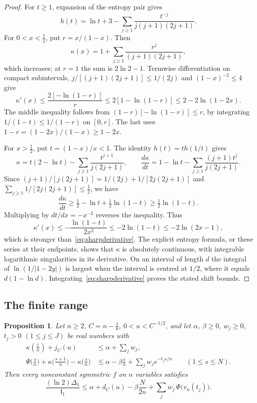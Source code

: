 \documentclass[11pt]{amsart}
\newtheorem{proposition}[theorem]{Proposition}
\theoremstyle{definition}
\theoremstyle{remark}
\newcommand{\I}{\mathsf I}
\begin{document}
\begin{proof}
For $t\ge1$, expansion of the entropy pair gives
\[
 h(t)=\ln t+3-\sum_{j\ge1}\frac{t^{-j}}{j(j+1)(2j+1)}.
\]
For $0<x<\frac12$, put $r=x/(1-x)$. Then
\[
 \kappa(x)=1+\sum_{j\ge1}\frac{r^j}{(j+1)(2j+1)},
\]
which increases; at $r=1$ the sum is $2\ln2-1$. Termwise differentiation on compact subintervals, $j/[(j+1)(2j+1)]\le1/(2j)$ and $(1-x)^{-2}\le4$ give
\[
 \kappa'(x)\le\frac{2[-\ln(1-r)]}{r}
 \le2[1-\ln(1-r)]\le2-2\ln(1-2x).
\]
The middle inequality follows from $(1-r)[-\ln(1-r)]\le r$, by integrating $1/(1-t)\le1/(1-r)$ on $[0,r]$. The last uses $1-r=(1-2x)/(1-x)\ge1-2x$.

For $x>\frac12$, put $t=(1-x)/x<1$. The identity $h(t)=t h(1/t)$ gives
\[
 \kappa=t(2-\ln t)-\sum_{j\ge1}\frac{t^{j+1}}{j(2j+1)},\qquad
 \frac{d\kappa}{dt}=1-\ln t-\sum_{j\ge1}\frac{(j+1)t^j}{j(2j+1)}.
\]
Since $(j+1)/[j(2j+1)]=1/(2j)+1/[2j(2j+1)]$ and $\sum_{j\ge1}1/[2j(2j+1)]\le\frac12$, we have
\[
 \frac{d\kappa}{dt}\ge\tfrac12-\ln t+\tfrac12\ln(1-t)\ge\tfrac12\ln(1-t).
\]
Multiplying by $dt/dx=-x^{-2}$ reverses the inequality. Thus
\[
 \kappa'(x)\le-\frac{\ln(1-t)}{2x^2}
 \le-2\ln(1-t)\le-2\ln(2x-1),
\]
which is stronger than~\eqref{eq:sharpderivative}. The explicit entropy formula, or these series at their endpoints, shows that $\kappa$ is absolutely continuous, with integrable logarithmic singularities in its derivative. On an interval of length $d$ the integral of $\ln(1/|1-2y|)$ is largest when the interval is centred at $1/2$, where it equals $d(1-\ln d)$. Integrating~\eqref{eq:sharpderivative} proves the stated shift bounds.
\end{proof}

\subsection{The finite range}
\begin{proposition}\label{prop:dual}
Let $n\ge2$, $C=n-\frac16$, $0<u<C^{-1/2}$, and let $\alpha$, $\beta\ge0$, $w_j\ge0$, $t_j>0$ $(1\le j\le J)$ be real numbers with
\begin{align*}
 \kappa(\tfrac1n)+j_C(u)&\le\alpha+\textstyle\sum_jw_j,\\
 \Psi\bigl(\tfrac sn\bigr)+\kappa\bigl(\tfrac{s+1}n\bigr)-\kappa\bigl(\tfrac sn\bigr)&\le\alpha-\beta\tfrac sn+\textstyle\sum_jw_je^{-t_js/n}\qquad(1\le s\le N).
\end{align*}
Then every nonconstant symmetric $f$ on $n$ variables satisfies
\[
 \frac{(\ln2)\Delta_1}{\I_1}\le\alpha+d_C(u)-\beta\frac{N}{2n}+\sum_jw_j\,\Phi\bigl(v_n(t_j)\bigr).
\]
\end{proposition}
\end{document}
